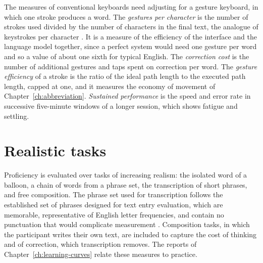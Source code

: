 The measures of conventional keyboards need adjusting for a gesture keyboard, in which one stroke produces a word. The \emph{gestures per character} is the number of strokes used divided by the number of characters in the final text, the analogue of keystrokes per character \cite{mackenzie2002}.\evD{} It is a measure of the efficiency of the interface and the language model together, since a perfect system would need one gesture per word and so a value of about one sixth for typical English. The \emph{correction cost} is the number of additional gestures and taps spent on correction per word. The \emph{gesture efficiency} of a stroke is the ratio of the ideal path length to the executed path length, capped at one, and it measures the economy of movement of Chapter~\ref{ch:abbreviation}. \emph{Sustained performance} is the speed and error rate in successive five-minute windows of a longer session, which shows fatigue and settling.

\section{Realistic tasks}

Proficiency is evaluated over tasks of increasing realism: the isolated word of a balloon, a chain of words from a phrase set, the transcription of short phrases, and free composition. The phrase set used for transcription follows the established set of phrases designed for text entry evaluation, which are memorable, representative of English letter frequencies, and contain no punctuation that would complicate measurement \cite{mackenzie2003}.\evD{} Composition tasks, in which the participant writes their own text, are included to capture the cost of thinking and of correction, which transcription removes. The reports of Chapter~\ref{ch:learning-curves} relate these measures to practice.
